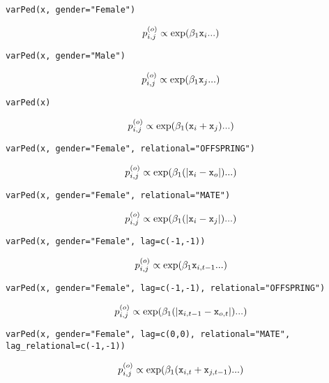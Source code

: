 \documentclass{article}
\begin{document}
\texttt{varPed(x, gender="Female")}

\begin{equation}
p^{(o)}_{i,j} \propto \textrm{exp}(\beta_{1}\textrm{\texttt{x}}_{i}...)
\end{equation}

\texttt{varPed(x, gender="Male")}

\begin{equation}
p^{(o)}_{i,j} \propto \textrm{exp}(\beta_{1}\textrm{\texttt{x}}_{j}...)
\end{equation}

\texttt{varPed(x)}

\begin{equation}
p^{(o)}_{i,j} \propto \textrm{exp}(\beta_{1}(\textrm{\texttt{x}}_{i}+\textrm{\texttt{x}}_{j})...)
\end{equation}

\texttt{varPed(x, gender="Female", relational="OFFSPRING")}

\begin{equation}
p^{(o)}_{i,j} \propto \textrm{exp}(\beta_{1}(|\textrm{\texttt{x}}_{i}-\textrm{\texttt{x}}_{o}|)...)
\end{equation}

\texttt{varPed(x, gender="Female", relational="MATE")}

\begin{equation}
p^{(o)}_{i,j} \propto \textrm{exp}(\beta_{1}(|\textrm{\texttt{x}}_{i}-\textrm{\texttt{x}}_{j}|)...)
\end{equation}

\texttt{varPed(x, gender="Female", lag=c(-1,-1))}

\begin{equation}
p^{(o)}_{i,j} \propto \textrm{exp}(\beta_{1}\textrm{\texttt{x}}_{i,t-1}...)
\end{equation}

\texttt{varPed(x, gender="Female", lag=c(-1,-1), relational="OFFSPRING")}

\begin{equation}
p^{(o)}_{i,j} \propto \textrm{exp}(\beta_{1}(|\textrm{\texttt{x}}_{i,t-1}-\textrm{\texttt{x}}_{o,t}|)...)
\end{equation}

\texttt{varPed(x, gender="Female", lag=c(0,0), relational="MATE",}\\
\texttt{lag\_relational=c(-1,-1))}

\begin{equation}
p^{(o)}_{i,j} \propto \textrm{exp}(\beta_{1}(\textrm{\texttt{x}}_{i,t}+\textrm{\texttt{x}}_{j,t-1})...)
\end{equation}
\end{document}
